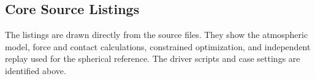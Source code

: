 \clearpage
\subsection{Core Source Listings}
The listings are drawn directly from the source files. They show the atmospheric model, force and contact calculations, constrained optimization, and independent replay used for the spherical reference. The driver scripts and case settings are identified above.






